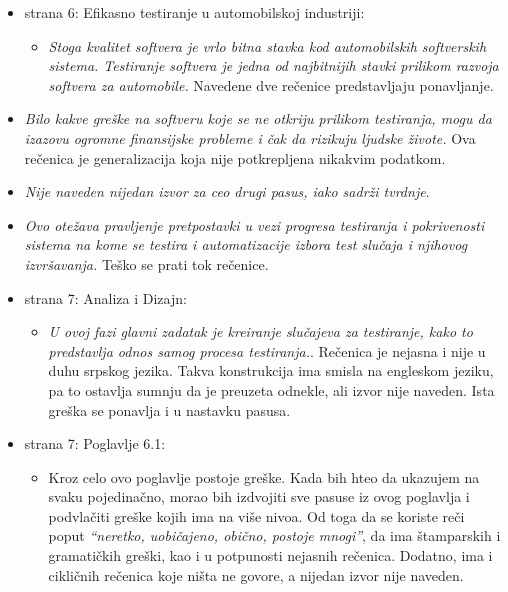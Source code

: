\documentclass[a4paper]{report}
\begin{document}
\begin{itemize}
\item strana 6: Efikasno testiranje u automobilskoj industriji:
  \begin{itemize}
\item {\em{Stoga kvalitet softvera je vrlo bitna stavka kod automobilskih softverskih sistema. Testiranje softvera je jedna od najbitnijih stavki prilikom razvoja softvera za automobile.}} Navedene dve rečenice predstavljaju ponavljanje.
  \end{itemize}
\item {\em{ Bilo kakve greške na softveru koje se
ne otkriju prilikom testiranja, mogu da izazovu ogromne finansijske probleme i čak da rizikuju ljudske živote.}} Ova rečenica je generalizacija koja nije potkrepljena nikakvim podatkom.
\item {\em{Nije naveden nijedan izvor za ceo drugi pasus, iako sadrži tvrdnje}}.
  \item {\em{Ovo otežava pravljenje pretpostavki u vezi progresa testiranja i pokrivenosti sistema na kome se testira i automatizacije izbora test slučaja i njihovog izvršavanja.}} Teško se prati tok rečenice.
\end{itemize}

\begin{itemize}
\item strana 7: Analiza i Dizajn:
  \begin{itemize}
  \item {\em{U ovoj fazi glavni zadatak je kreiranje slučajeva za testiranje, kako to predstavlja odnos samog procesa testiranja.}}. Rečenica je nejasna i nije u duhu srpskog jezika. Takva konstrukcija ima smisla na engleskom jeziku, pa to ostavlja sumnju da je preuzeta odnekle, ali izvor nije naveden. Ista greška se ponavlja i u nastavku pasusa.
  \end{itemize}
\end{itemize}


\begin{itemize}
\item strana 7: Poglavlje 6.1:
  \begin{itemize}
  \item Kroz celo ovo poglavlje postoje greške. Kada bih hteo da ukazujem na svaku pojedinačno, morao bih izdvojiti sve pasuse iz ovog poglavlja i podvlačiti greške kojih ima na više nivoa. Od toga da se koriste reči poput {\em{``neretko, uobičajeno, obično, postoje mnogi''}}, da ima štamparskih i gramatičkih greški, kao i u potpunosti nejasnih rečenica. Dodatno, ima i cikličnih rečenica koje ništa ne govore, a nijedan izvor nije naveden.
  \end{itemize}
\end{itemize}
\end{document}
